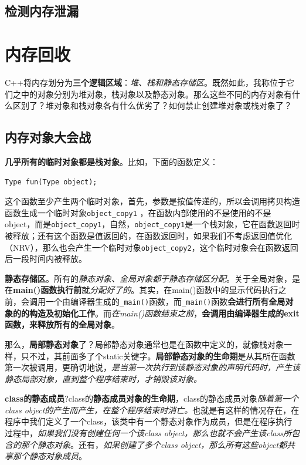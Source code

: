 \documentclass[UTF8,a4paper,12pt]{ctexbook}
\begin{document}
			
			
		\subsection{检测内存泄漏}
			
			
			
	\section{内存回收}
		C++将内存划分为\textbf{三个逻辑区域}：\textit{堆、栈和静态存储区}。既然如此，我称位于它们之中的对象分别为堆对象，栈对象以及静态对象。那么这些不同的内存对象有什么区别了？堆对象和栈对象各有什么优劣了？如何禁止创建堆对象或栈对象了？
		
		\subsection{内存对象大会战}
			\textbf{几乎所有的临时对象都是栈对象}。比如，下面的函数定义：
			
			\verb|Type fun(Type object);|
			
			这个函数至少产生两个临时对象，首先，参数是按值传递的，所以会调用拷贝构造函数生成一个临时对象\verb|object_copy1| ，在函数内部使用的不是使用的不是object，而是\verb|object_copy1|，自然，\verb|object_copy1|是一个栈对象，它在函数返回时被释放；还有这个函数是值返回的，在函数返回时，如果我们不考虑返回值优化（NRV），那么也会产生一个临时对象\verb|object_copy2|，这个临时对象会在函数返回后一段时间内被释放。
			
			\textbf{静态存储区}。所有的\textit{静态对象、全局对象都于静态存储区分配}。关于全局对象，是在\textbf{main()函数执行前}就\textit{分配好了的}。其实，在main()函数中的显示代码执行之前，会调用一个由编译器生成的\verb|_main()|函数，而\verb|_main()|函数\textbf{会进行所有全局对象的的构造及初始化工作}。而\textit{在main()函数结束之前}，\textbf{会调用由编译器生成的exit函数，来释放所有的全局对象}。
			
			那么，\textbf{局部静态对象}了？局部静态对象通常也是在函数中定义的，就像栈对象一样，只不过，其前面多了个static关键字。\textbf{局部静态对象的生命期}是从其所在函数第一次被调用，更确切地说，\textit{是当第一次执行到该静态对象的声明代码时，产生该静态局部对象，直到整个程序结束时，才销毁该对象。}
			
			\textbf{class的静态成员}?class的\textbf{静态成员对象的生命期}，class的静态成员对象\textit{随着第一个class object的产生而产生，在整个程序结束时消亡。}也就是有这样的情况存在，在程序中我们定义了一个class，该类中有一个静态对象作为成员，但是在程序执行过程中，\textit{如果我们没有创建任何一个该class object，那么也就不会产生该class所包含的那个静态对象}。还有，\textit{如果创建了多个class object，那么所有这些object都共享那个静态对象成员}。
			
\end{document}
